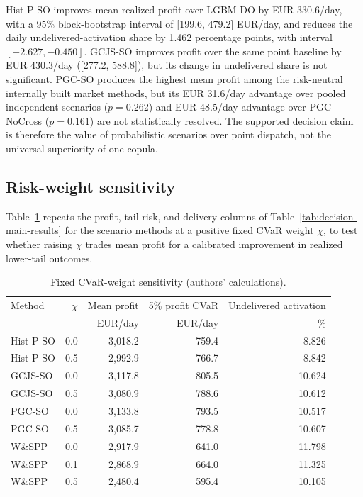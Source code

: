 \documentclass[11pt,a4paper]{article}
\begin{document}
Hist-P-SO improves mean realized profit over LGBM-DO by
EUR 330.6/day, with a 95\% block-bootstrap interval of
[199.6, 479.2] EUR/day, and reduces the daily undelivered-activation share by
1.462 percentage points, with interval $[-2.627,-0.450]$.  GCJS-SO improves
profit over the same point baseline by EUR 430.3/day
([277.2, 588.8]), but its change in undelivered share is not significant.
PGC-SO produces the highest mean profit among the risk-neutral internally built
market methods, but its EUR 31.6/day advantage over pooled independent
scenarios ($p=0.262$) and EUR 48.5/day advantage over PGC-NoCross
($p=0.161$) are not statistically resolved.  The supported decision claim is
therefore the value of probabilistic scenarios over point dispatch, not the
universal superiority of one copula.

\subsection{Risk-weight sensitivity}

Table~\ref{tab:risk-sensitivity} repeats the profit, tail-risk, and delivery
columns of Table~\ref{tab:decision-main-results} for the scenario methods at a
positive fixed CVaR weight $\chi$, to test whether raising $\chi$ trades mean
profit for a calibrated improvement in realized lower-tail outcomes.

\begin{table}[htbp]
  \centering
  \small
  \caption{Fixed CVaR-weight sensitivity (authors' calculations).}
  \begin{tabular}{lrrrr}
    \toprule
    Method & $\chi$ & Mean profit & 5\% profit CVaR & Undelivered activation \\
      & & EUR/day & EUR/day & \% \\
    \midrule
    Hist-P-SO & 0.0 & 3,018.2 & 759.4 & 8.826 \\
    Hist-P-SO & 0.5 & 2,992.9 & 766.7 & 8.842 \\
    GCJS-SO & 0.0 & 3,117.8 & 805.5 & 10.624 \\
    GCJS-SO & 0.5 & 3,080.9 & 788.6 & 10.612 \\
    PGC-SO & 0.0 & 3,133.8 & 793.5 & 10.517 \\
    PGC-SO & 0.5 & 3,085.7 & 778.8 & 10.607 \\
    W\&SPP~\cite{mancini2024} & 0.0 & 2,917.9 & 641.0 & 11.798 \\
    W\&SPP~\cite{mancini2024} & 0.1 & 2,868.9 & 664.0 & 11.325 \\
    W\&SPP~\cite{mancini2024} & 0.5 & 2,480.4 & 595.4 & 10.105 \\
    \bottomrule
  \end{tabular}
  \label{tab:risk-sensitivity}
\end{table}
\end{document}
